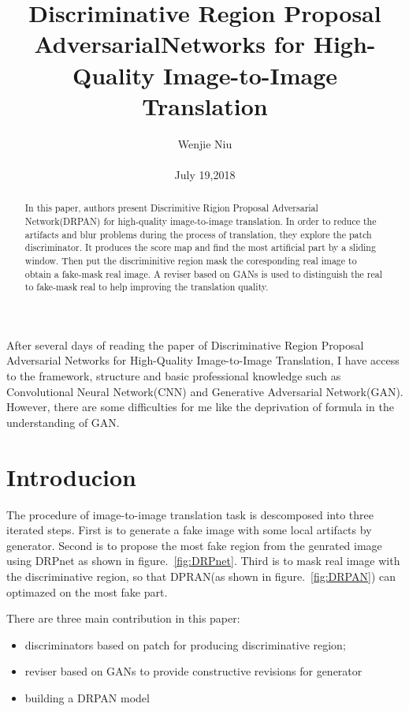 \documentclass[10pt,twocolumn,letterpaper]{article}
\begin{document}
\title{Discriminative Region Proposal AdversarialNetworks for High-Quality Image-to-Image Translation}

\author{Wenjie Niu\\\\ July 19,2018}

\maketitle
After several days of reading the paper of Discriminative Region Proposal Adversarial Networks for High-Quality Image-to-Image Translation, I have access to the framework, structure and basic professional knowledge such as Convolutional Neural Network(CNN) and Generative Adversarial Network(GAN). However, there are some difficulties for me like the deprivation of formula in the understanding of GAN. \par
\begin{abstract}
In this paper, authors present Discrimitive Rigion Proposal Adversarial Network(DRPAN) for high-quality image-to-image translation. In order to reduce the artifacts and blur problems during the process of translation, they explore the patch discriminator.  It produces the score map and find the most artificial part by a sliding window. Then put the discriminitive region mask the coresponding real image to obtain a fake-mask real image. A reviser based on GANs is used to distinguish the real to fake-mask real to help improving the translation quality.
\end{abstract}

\section{Introducion}
The procedure of image-to-image translation task is descomposed into three iterated steps. First is to generate a fake image with some local artifacts by generator. Second is to propose the most fake region from the genrated image using DRPnet as shown in figure.~\ref{fig:DRPnet}. Third is to mask real image with the discriminative region, so that DPRAN(as shown in figure.~\ref{fig:DRPAN}) can optimazed on the most fake part.\par
There are three main contribution in this paper:
\begin{itemize}
\item discriminators based on patch for producing discriminative region;
\item reviser based on GANs to provide constructive revisions for generator
\item building a DRPAN model
\end{itemize}
\end{document}
